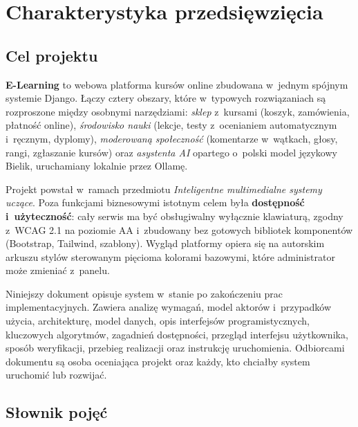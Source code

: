 \chapter{Charakterystyka przedsięwzięcia}

\section{Cel projektu}

\textbf{E-Learning} to webowa platforma kursów online zbudowana w~jednym spójnym systemie
Django. Łączy cztery obszary, które w~typowych rozwiązaniach są rozproszone między osobnymi
narzędziami: \emph{sklep} z~kursami (koszyk, zamówienia, płatność online), \emph{środowisko
nauki} (lekcje, testy z~ocenianiem automatycznym i~ręcznym, dyplomy), \emph{moderowaną
społeczność} (komentarze w~wątkach, głosy, rangi, zgłaszanie kursów) oraz \emph{asystenta
AI} opartego o~polski model językowy Bielik, uruchamiany lokalnie przez Ollamę.

Projekt powstał w~ramach przedmiotu \emph{Inteligentne multimedialne systemy uczące}. Poza funkcjami biznesowymi
istotnym celem była \textbf{dostępność i~użyteczność}: cały serwis ma być obsługiwalny wyłącznie klawiaturą,
zgodny z~WCAG 2.1 na poziomie AA i~zbudowany bez gotowych bibliotek komponentów
(Bootstrap, Tailwind, szablony). Wygląd platformy opiera się na autorskim arkuszu stylów
sterowanym pięcioma kolorami bazowymi, które administrator może zmieniać z~panelu.

Niniejszy dokument opisuje system w~stanie po zakończeniu prac implementacyjnych. Zawiera
analizę wymagań, model aktorów i~przypadków użycia, architekturę, model danych, opis
interfejsów programistycznych, kluczowych algorytmów, zagadnień dostępności, przegląd
interfejsu użytkownika, sposób weryfikacji, przebieg realizacji oraz instrukcję
uruchomienia. Odbiorcami dokumentu są osoba oceniająca projekt oraz każdy, kto chciałby
system uruchomić lub rozwijać.

\section{Słownik pojęć}

